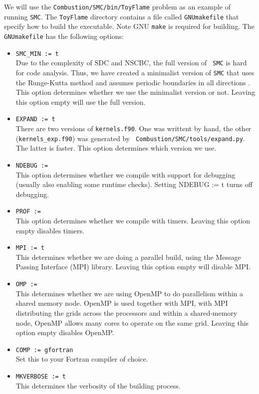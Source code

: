 \documentclass[11pt,letterpaper]{article}
\begin{document}
We will use the {\tt Combustion/SMC/bin/ToyFlame} problem as an
example of running {\tt SMC}.  The {\tt ToyFlame} directory contains
a file called {\tt GNUmakefile} that specify how to build the
executable.  Note GNU {\tt make} is required for building.  The {\tt
  GNUmakefile} has the following options:
\begin{itemize}
\item {\tt SMC\_MIN := t}\\
  Due to the complexity of SDC and NSCBC, the full version of {\tt
    SMC} is hard for code analysis.  Thus, we have created a
  minimalist version of {\tt SMC} that uses the Runge-Kutta method and
  assumes periodic boundaries in all directions .  This option
  determines whether we use the minimalist version or not.  Leaving
  this option empty will use the full version.
\item {\tt EXPAND := t}\\
  There are two versions of {\tt kernels.f90}.  One was writtent by
  hand, the other ({\tt kernels\_exp.f90}) was generated by {\tt
    Combustion/SMC/tools/expand.py}.  The latter is faster.  This option
  determines which version we use.
\item {\tt NDEBUG :=}\\
  This option determines whether we compile with support for debugging
  (usually also enabling some runtime checks). Setting NDEBUG := t
  turns off debugging.
\item {\tt PROF :=}\\
  This option determines whether we compile with timers. Leaving this
  option empty disables timers.
\item {\tt MPI := t}\\
  This determines whether we are doing a parallel build, using the
  Message Passing Interface (MPI) library. Leaving this
  option empty will disable MPI. 
\item {\tt OMP :=}\\
  This determines whether we are using OpenMP to do parallelism within
  a shared memory node. OpenMP is used together with MPI, with MPI
  distributing the grids across the processors and within a
  shared-memory node, OpenMP allows many cores to operate on the same
  grid.  Leaving this option empty disables OpenMP.
\item {\tt COMP := gfortran}\\
  Set this to your Fortran compiler of choice.
\item {\tt MKVERBOSE := t}\\
  This determines the verbosity of the building process.
\end{itemize} 
\end{document}

